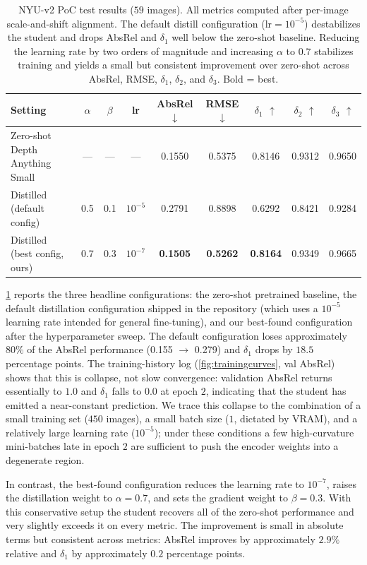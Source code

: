 \documentclass[10pt,twocolumn,letterpaper]{article}
\begin{document}
\begin{table}[t]
\centering
\begin{tabular}{lcccccccc}
\toprule
Setting & $\alpha$ & $\beta$ & lr & AbsRel $\downarrow$ & RMSE $\downarrow$ & $\delta_1$ $\uparrow$ & $\delta_2$ $\uparrow$ & $\delta_3$ $\uparrow$ \\
\midrule
Zero-shot Depth Anything Small         & ---  & ---  & ---       & 0.1550 & 0.5375 & 0.8146 & 0.9312 & 0.9650 \\
Distilled (default config)             & 0.5  & 0.1  & $10^{-5}$ & 0.2791 & 0.8898 & 0.6292 & 0.8421 & 0.9284 \\
Distilled (best config, ours)          & 0.7  & 0.3  & $10^{-7}$ & \textbf{0.1505} & \textbf{0.5262} & \textbf{0.8164} & 0.9349 & 0.9665 \\
\bottomrule
\end{tabular}
\caption{NYU-v2 PoC test results ($59$ images). All metrics computed
after per-image scale-and-shift alignment. The default distill
configuration ($\text{lr}=10^{-5}$) destabilizes the student and drops
AbsRel and $\delta_1$ well below the zero-shot baseline. Reducing the
learning rate by two orders of magnitude and increasing $\alpha$ to
$0.7$ stabilizes training and yields a small but consistent improvement
over zero-shot across AbsRel, RMSE, $\delta_1$, $\delta_2$, and
$\delta_3$. Bold = best.}
\label{tab:nyu}
\end{table}

\cref{tab:nyu} reports the three headline configurations: the
zero-shot pretrained baseline, the default distillation configuration
shipped in the repository (which uses a $10^{-5}$ learning rate intended
for general fine-tuning), and our best-found configuration after the
hyperparameter sweep. The default configuration loses approximately
$80\%$ of the AbsRel performance (0.155 $\rightarrow$ 0.279) and
$\delta_1$ drops by $18.5$ percentage points. The training-history log
(\cref{fig:trainingcurves}, val AbsRel) shows that this is collapse, not
slow convergence: validation AbsRel returns essentially to $1.0$ and
$\delta_1$ falls to $0.0$ at epoch $2$, indicating that the student has
emitted a near-constant prediction. We trace this collapse to the
combination of a small training set ($450$ images), a small batch size
($1$, dictated by VRAM), and a relatively large learning rate
($10^{-5}$); under these conditions a few high-curvature mini-batches
late in epoch $2$ are sufficient to push the encoder weights into a
degenerate region.

In contrast, the best-found configuration reduces the learning rate to
$10^{-7}$, raises the distillation weight to $\alpha=0.7$, and sets the
gradient weight to $\beta=0.3$. With this conservative setup the student
recovers all of the zero-shot performance and very slightly exceeds it
on every metric. The improvement is small in absolute terms but
consistent across metrics: AbsRel improves by approximately $2.9\%$
relative and $\delta_1$ by approximately $0.2$ percentage points.
\end{document}
